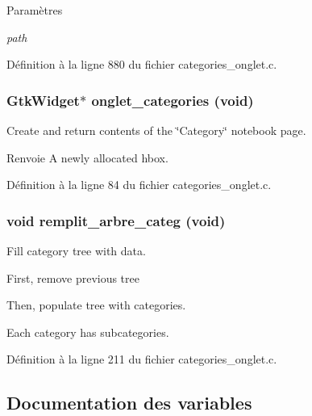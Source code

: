 \begin{DoxyParams}{Paramètres}
\item[{\em path}]\end{DoxyParams}


Définition à la ligne 880 du fichier categories\_\-onglet.c.

\subsubsection[{onglet\_\-categories}]{\setlength{\rightskip}{0pt plus 5cm}GtkWidget$\ast$ onglet\_\-categories (void)}\label{categories__onglet_8c_a4aca926dc47f973c138ed72e9aad5804}
Create and return contents of the \char`\"{}Category\char`\"{} notebook page.

\begin{DoxyReturn}{Renvoie}
A newly allocated hbox. 
\end{DoxyReturn}


Définition à la ligne 84 du fichier categories\_\-onglet.c.

\subsubsection[{remplit\_\-arbre\_\-categ}]{\setlength{\rightskip}{0pt plus 5cm}void remplit\_\-arbre\_\-categ (void)}\label{categories__onglet_8c_a07984d808278a498b3fef3e187cc29e2}
Fill category tree with data. 

First, remove previous tree

Then, populate tree with categories.

Each category has subcategories. 



Définition à la ligne 211 du fichier categories\_\-onglet.c.



\subsection{Documentation des variables}
